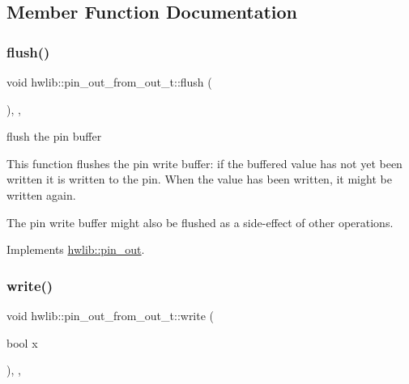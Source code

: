 \subsection{Member Function Documentation}
\mbox{\label{classhwlib_1_1pin__out__from__out__t_ac3a382842264da94644aeb2d8981ffd4}} 
\subsubsection{\texorpdfstring{flush()}{flush()}}
{\footnotesize\ttfamily void hwlib\+::pin\+\_\+out\+\_\+from\+\_\+out\+\_\+t\+::flush (\begin{DoxyParamCaption}{ }\end{DoxyParamCaption})\hspace{0.3cm}{\ttfamily [inline]}, {\ttfamily [override]}, {\ttfamily [virtual]}}





flush the pin buffer

This function flushes the pin write buffer\+: if the buffered value has not yet been written it is written to the pin. When the value has been written, it might be written again.

The pin write buffer might also be flushed as a side-\/effect of other operations. 

Implements \hyperlink{classhwlib_1_1pin__out_ac22910317477a52431a44e7e3c66fc57}{hwlib\+::pin\+\_\+out}.

\mbox{\label{classhwlib_1_1pin__out__from__out__t_acda4bf8988bab6746d7bb9d520c303ce}} 
\subsubsection{\texorpdfstring{write()}{write()}}
{\footnotesize\ttfamily void hwlib\+::pin\+\_\+out\+\_\+from\+\_\+out\+\_\+t\+::write (\begin{DoxyParamCaption}\item[{bool}]{x }\end{DoxyParamCaption})\hspace{0.3cm}{\ttfamily [inline]}, {\ttfamily [override]}, {\ttfamily [virtual]}}





